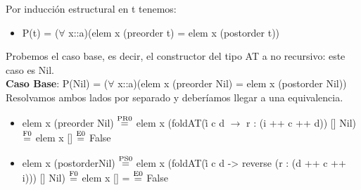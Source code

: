 \documentclass{article}
\begin{document}
Por inducción estructural en t tenemos: 
\begin{itemize}
    \item P(t) = ($\forall$ x::a)(elem x (preorder t) = elem x (postorder t))
\end{itemize}

Probemos el caso base, es decir, el constructor del tipo AT a no recursivo: este caso es Nil. \\ 
\textbf{Caso Base}: P(Nil) = ($\forall$ x::a)(elem x (preorder Nil) = elem x (postorder Nil)) \\ 
Resolvamos ambos lados por separado y deberíamos llegar a una equivalencia. 

\begin{itemize}
    \item elem x (preorder Nil) $\stackrel{\text{PR0}}{=}$ elem x (foldAT(\r i c d $\rightarrow$ r : (i ++ c ++ d)) [] Nil) $\stackrel{\text{F0}}{=}$ elem x [] $\stackrel{\text{E0}}{=}$ False
    
    \item elem x (postorderNil) $\stackrel{\text{PS0}}{=}$ elem x (foldAT(\r i c d -> reverse (r : (d ++ c ++ i))) [] Nil) $\stackrel{\text{F0}}{=}$ elem x [] = $\stackrel{\text{E0}}{=}$ False
\end{itemize}
\end{document}
